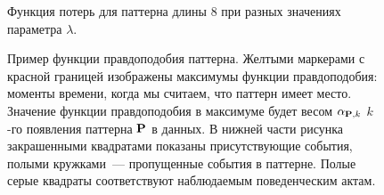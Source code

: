 \documentclass[12pt,fсeqn]{article}
\begin{document}
\begin{figure}[H]
\noindent{}
\caption{ Функция потерь для паттерна длины 8 при разных значениях параметра $\lambda$. }
\end{figure}
\begin{figure}[H]
\noindent{}
\caption{ Пример функции правдоподобия паттерна. Желтыми маркерами с красной границей изображены максимумы функции правдоподобия: 
моменты времени, когда мы считаем, что паттерн имеет место. Значение функции правдоподобия в максимуме будет весом $\alpha_{{\bf P},k}$
$k$-го появления паттерна ${\bf P}$ в данных.
В нижней части рисунка закрашенными квадратами показаны присутствующие
события, полыми кружками~--- пропущенные события в паттерне. Полые серые квадраты соответствуют наблюдаемым поведенческим актам.}
\end{figure}
\end{document}
